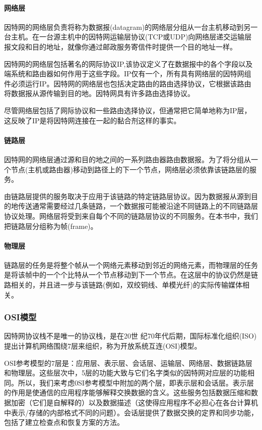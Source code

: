 \paragraph{网络层}

    因特网的网络层负责将称为数据报(datagram)的网络层分组从一台主机移动到另一台主机。在一台源主机中的因特网运输层协议(TCP或UDP)向网络层递交运输层报文段和目的地址，就像你通过邮政服务寄信件时提供一个目的地址一样。

    因特网的网络层包括著名的网际协议IP,该协议定义了在数据报中的各个字段以及端系统和路由器如何作用于这些字段。IP仅有一个，所有具有网络层的因特网组件必须运行IP。因特网的网络层也包括决定路由的路由选择协议，它根据该路由将数据报从源传输到目的地。因特网具有许多路由选择协议。

    尽管网络层包括了网际协议和一些路由选择协议，但通常把它简单地称为IP层，这反映了IP是将因特网连接在一起的黏合剂这样的事实。

\paragraph{链路层}

    因特网的网络层通过源和目的地之间的一系列路由器路由数据报。为了将分组从一个节点(主机或路由器)移动到路径上的下一个节点，网络层必须依靠该链路层的服务。

    由链路层提供的服务取决于应用于该链路的特定链路层协议。因为数据报从源到目的地传送通常需要经过几条链路，一个数据报可能被沿途不同链路上的不同链路层协议处理。网络层将受到来自每个不同的链路层协议的不同服务。在本书中，我们把链路层分组称为帧(frame)。

\paragraph{物理层}

链路层的任务是将整个帧从一个网络元素移动到邻近的网络元素，而物理层的任务是将该帧中的一个个比特从一个节点移动到下一个节点。在这层中的协议仍然是链路相关的，并且进一步与该链路(例如，双绞铜线、单模光纤)的实际传输媒体相关。

\subsubsection{OSI模型}

    因特网协议栈不是唯一的协议栈，是在20世 纪70年代后期，国际标准化组织(ISO)提出计算机网络围绕7层来组织，称为开放系统互连(OSI)模型。

    OSI参考模型的7层是：应用层、表示层、会话层、运输层、网络层、数据链路层和物理层。这些层次中，5层的功能大致与它们名字类似的因特网对应层的功能相同。所以，我们来考虑0SI参考模型中附加的两个层，即表示层和会话层。表示层的作用是使通信的应用程序能够解释交换数据的含义。这些服务包括数据压缩和数据加密（它们是自解释的）以及数据描述（这使得应用程序不必担心在各台计算机中表示/存储的内部格式不同的问题）。会话层提供了数据交换的定界和同步功能，包括了建立检查点和恢复方案的方法。

